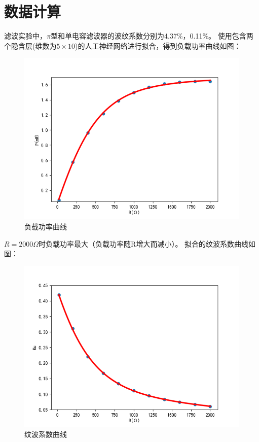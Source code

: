 \documentclass[UTF8]{ctexart}
\begin{document}
\section{数据计算}
滤波实验中，$\pi$型和单电容滤波器的波纹系数分别为4.37\%，0.11\%。
使用包含两个隐含层(维数为$5\times10$)的人工神经网络进行拟合，得到负载功率曲线如图：
\begin{figure}[h!]
    \centering
    \includegraphics[scale=0.7]{负载功率曲线.png}
    \caption{负载功率曲线}
\end{figure}
\newline
$R=2000\Omega$时负载功率最大（负载功率随R增大而减小）。
\newline
拟合的纹波系数曲线如图：
\begin{figure}[h!]
    \centering
    \includegraphics[scale=0.7]{纹波系数曲线.png}
    \caption{纹波系数曲线}
\end{figure}
\end{document}
